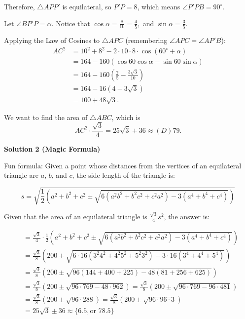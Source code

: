 \begin{enumerate}
 Therefore, $\triangle APP'$ is equilateral, so $P'P=8$, which means $\angle P'PB = 90^{\circ}.$ 

 Let $\angle BP'P = \alpha .$ Notice that $\cos\alpha = \frac{8}{10}=\frac{4}{5},$ and $\sin\alpha = \frac{3}{5}.$

 Applying the Law of Cosines to $\triangle APC$ (remembering $\angle APC = \angle AP'B$):
 \begin{align*} AC^2 &= 10^2+8^2-2\cdot10\cdot8\cdot \cos(60^{\circ}+\alpha)\\&= 164-160(\cos60\cos\alpha-\sin60\sin\alpha)\\&= 164-160(\frac{2}{5}-\frac{3\sqrt3}{10}) \\&= 164-16(4-3\sqrt3) \\ &= 100+48\sqrt3.\end{align*}


 We want to find the area of $\triangle ABC$, which is 
 \[AC^2\cdot\frac{\sqrt3}{4}=25\sqrt3+36\approx\boxed{(D) 79}.\]




\textbf{Solution 2 (Magic Formula)}

Fun formula:  Given a point whose distances from the vertices of an equilateral triangle are $a$, $b$, and $c$, the side length of the triangle is:

 
 \[s=\sqrt{\frac{1}{2}\left(a^2+b^2+c^2\pm\sqrt{6(a^2b^2+b^2c^2+c^2a^2)-3(a^4+b^4+c^4)}\right)}\]

 Given that the area of an equilateral triangle is $\frac{\sqrt{3}}{4}s^2$, the answer is:

 
 \begin{align*} [ABC] &= \frac{\sqrt{3}}{4}\cdot\frac{1}{2}\left(a^2+b^2+c^2\pm\sqrt{6(a^2b^2+b^2c^2+c^2a^2)-3(a^4+b^4+c^4)}\right)\\ &= \frac{\sqrt{3}}{8}\left(200\pm\sqrt{6\cdot 16(3^2 4^2+4^2 5^2+5^2 3^2)-3\cdot16(3^4+4^4+5^4)}\right)\\ &= \frac{\sqrt{3}}{8}\left(200\pm\sqrt{96(144+400+225)-48(81+256+625)}\right)\\ &= \frac{\sqrt{3}}{8}\left(200\pm\sqrt{96\cdot769-48\cdot962}\right) = \frac{\sqrt{3}}{8}\left(200\pm\sqrt{96\cdot769-96\cdot481}\right)\\ &= \frac{\sqrt{3}}{8}\left(200\pm\sqrt{96\cdot288}\right) = \frac{\sqrt{3}}{8}\left(200\pm\sqrt{96\cdot96\cdot3}\right)\\ &= 25\sqrt{3}\pm36 \approx \{6.5, \text{or } 78.5\} \end{align*}


\end{enumerate}
